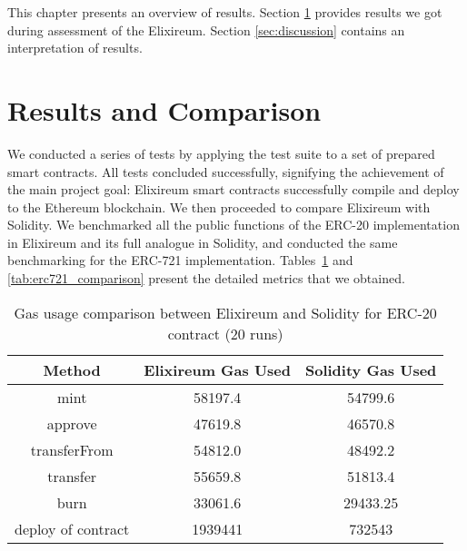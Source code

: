 This chapter presents an overview of results. Section \ref{sec:results_and_comparison} provides results we got during assessment of the Elixireum. Section \ref{sec:discussion} contains an interpretation of results.

\section{Results and Comparison}
\label{sec:results_and_comparison}
We conducted a series of tests by applying the test suite to a set of prepared smart contracts. All tests concluded successfully, signifying the achievement of the main project goal: Elixireum smart contracts successfully compile and deploy to the Ethereum blockchain. We then proceeded to compare Elixireum with Solidity. We benchmarked all the public functions of the ERC-20 implementation in Elixireum and its full analogue in Solidity, and conducted the same benchmarking for the ERC-721 implementation. Tables~\ref{tab:erc20_comparison} and \ref{tab:erc721_comparison} present the detailed metrics that we obtained.


\begin{table}[h!]
  \centering
  \renewcommand{\arraystretch}{1.2}
  \begin{tabular}{|c|c|c|}
  \hline
  \textbf{Method} & \textbf{Elixireum Gas Used} & \textbf{Solidity Gas Used} \\ \hline
  mint            & 58197.4              & 54799.6              \\ \hline
  approve         & 47619.8              & 46570.8              \\ \hline
  transferFrom    & 54812.0              & 48492.2              \\ \hline
  transfer        & 55659.8              & 51813.4              \\ \hline
  burn            & 33061.6              & 29433.25             \\ \hline
  deploy of contract       & 1939441              & 732543               \\ \hline
  \end{tabular}
  \caption{Gas usage comparison between Elixireum and Solidity for ERC-20 contract (20 runs)}
  \label{tab:erc20_comparison}
  \end{table}

